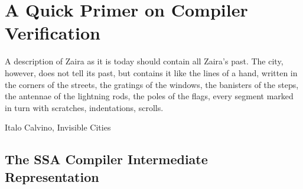 \chapter{A Quick Primer on Compiler Verification}
\label{ch:background}
\epigraph{A description of Zaira as it is today should contain all Zaira’s
past. The city, however, does not tell its past, but contains it like the lines
of a hand, written in the corners of the streets, the gratings of the windows,
the banisters of the steps, the antennae of the lightning rods, the poles of
the flags, every segment marked in turn with scratches, indentations,
scrolls.}{Italo Calvino, Invisible Cities}




\section{The SSA Compiler Intermediate Representation}
\label{sec:bg:ssa}

